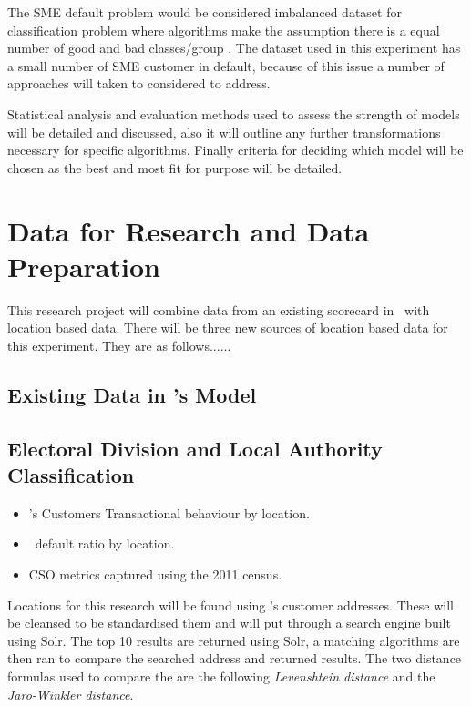 The SME default problem would be considered imbalanced dataset for classification problem where algorithms make the assumption there is a equal number of good and bad classes/group \citep{japkowicz_class_2000}. The dataset used in this experiment has a small number of SME customer in default, because of this issue a number of approaches will taken to considered to address.

Statistical analysis and evaluation methods used to assess the strength of models will be detailed and discussed, also it will outline any further transformations necessary for specific algorithms. Finally criteria for deciding which model will be chosen as the best and most fit for purpose will be detailed.

\section{Data for Research and Data Preparation}
This research project will combine data from an existing scorecard in \subjectname\ with location based data. There will be three new sources of location based data for this experiment. They are as follows......

\subsection{Existing Data in \subjectname's Model}

\subsection{Electoral Division and Local Authority Classification}
\begin{itemize}
	\item \subjectname's Customers Transactional behaviour by location.
	\item \subjectname\ default ratio by location.
	\item CSO metrics captured using the 2011 census. 
\end{itemize}

Locations for this research will be found using \subjectname's customer addresses. These will be cleansed to be standardised them and will put through a search engine built using Solr. The top 10 results are returned using Solr, a matching algorithms are then ran to compare the searched address and returned results. The two distance formulas used to compare the are the following \textit{Levenshtein distance} and the \textit{Jaro-Winkler distance}.

